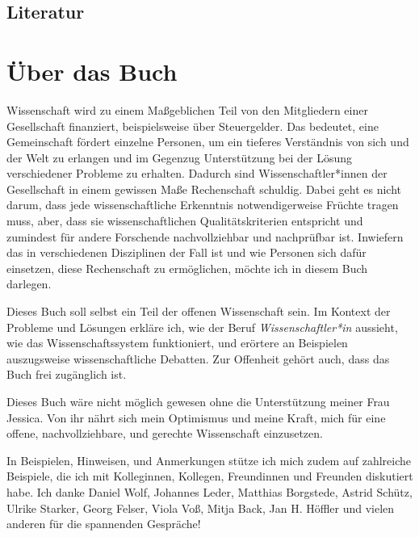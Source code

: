 \documentclass[
  letterpaper,
  DIV=11,
  numbers=noendperiod]{scrreprt}
\begin{document}
\section{Literatur}\label{literatur}


\chapter{Über das Buch}\label{uxfcber-das-buch}

Wissenschaft wird zu einem Maßgeblichen Teil von den Mitgliedern einer
Gesellschaft finanziert, beispielsweise über Steuergelder. Das bedeutet,
eine Gemeinschaft fördert einzelne Personen, um ein tieferes Verständnis
von sich und der Welt zu erlangen und im Gegenzug Unterstützung bei der
Lösung verschiedener Probleme zu erhalten. Dadurch sind
Wissenschaftler*innen der Gesellschaft in einem gewissen Maße
Rechenschaft schuldig. Dabei geht es nicht darum, dass jede
wissenschaftliche Erkenntnis notwendigerweise Früchte tragen muss, aber,
dass sie wissenschaftlichen Qualitätskriterien entspricht und zumindest
für andere Forschende nachvollziehbar und nachprüfbar ist. Inwiefern das
in verschiedenen Disziplinen der Fall ist und wie Personen sich dafür
einsetzen, diese Rechenschaft zu ermöglichen, möchte ich in diesem Buch
darlegen.

Dieses Buch soll selbst ein Teil der offenen Wissenschaft sein. Im
Kontext der Probleme und Lösungen erkläre ich, wie der Beruf
\emph{Wissenschaftler*in} aussieht, wie das Wissenschaftssystem
funktioniert, und erörtere an Beispielen auszugsweise wissenschaftliche
Debatten. Zur Offenheit gehört auch, dass das Buch frei zugänglich ist.

\begin{tcolorbox}[enhanced jigsaw, title=\textcolor{quarto-callout-note-color}{\faInfo}\hspace{0.5em}{Danksagungen}, colbacktitle=quarto-callout-note-color!10!white, rightrule=.15mm, titlerule=0mm, left=2mm, bottomrule=.15mm, arc=.35mm, leftrule=.75mm, toprule=.15mm, opacityback=0, breakable, bottomtitle=1mm, colframe=quarto-callout-note-color-frame, toptitle=1mm, opacitybacktitle=0.6, coltitle=black, colback=white]

Dieses Buch wäre nicht möglich gewesen ohne die Unterstützung meiner
Frau Jessica. Von ihr nährt sich mein Optimismus und meine Kraft, mich
für eine offene, nachvollziehbare, und gerechte Wissenschaft
einzusetzen.

In Beispielen, Hinweisen, und Anmerkungen stütze ich mich zudem auf
zahlreiche Beispiele, die ich mit Kolleginnen, Kollegen, Freundinnen und
Freunden diskutiert habe. Ich danke Daniel Wolf, Johannes Leder,
Matthias Borgstede, Astrid Schütz, Ulrike Starker, Georg Felser, Viola
Voß, Mitja Back, Jan H. Höffler und vielen anderen für die spannenden
Gespräche!

\end{tcolorbox}
\end{document}
